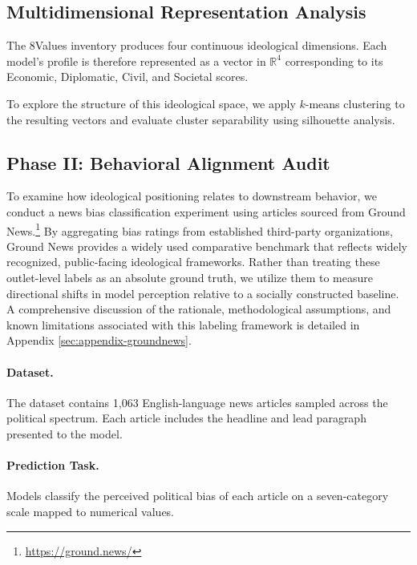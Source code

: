 \documentclass[11pt]{article}
\begin{document}
\subsection{Multidimensional Representation Analysis}

The 8Values inventory produces four continuous ideological dimensions. Each model's profile is therefore represented as a vector in $\mathbb{R}^4$ corresponding to its Economic, Diplomatic, Civil, and Societal scores.

To explore the structure of this ideological space, we apply $k$-means clustering to the resulting vectors and evaluate cluster separability using silhouette analysis.

\subsection{Phase II: Behavioral Alignment Audit}

To examine how ideological positioning relates to downstream behavior, we conduct a news bias classification experiment using articles sourced from Ground News.\footnote{\url{https://ground.news/}} By aggregating bias ratings from established third-party organizations, Ground News provides a widely used comparative benchmark that reflects widely recognized, public-facing ideological frameworks. Rather than treating these outlet-level labels as an absolute ground truth, we utilize them to measure directional shifts in model perception relative to a socially constructed baseline. A comprehensive discussion of the rationale, methodological assumptions, and known limitations associated with this labeling framework is detailed in Appendix \ref{sec:appendix-groundnews}.

\paragraph{Dataset.}

The dataset contains 1,063 English-language news articles sampled across the political spectrum. Each article includes the headline and lead paragraph presented to the model.

\paragraph{Prediction Task.}

Models classify the perceived political bias of each article on a seven-category scale mapped to numerical values.
\end{document}
